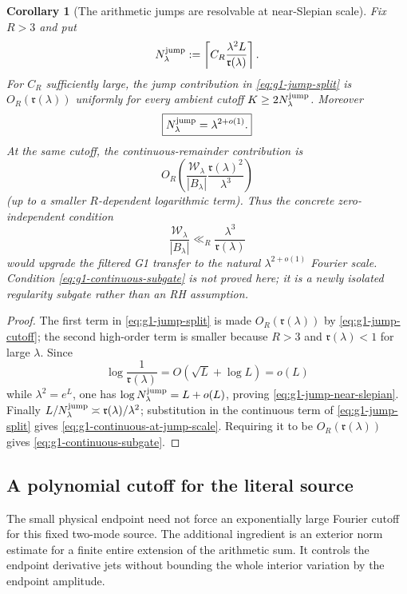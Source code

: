\documentclass[11pt]{article}
\newtheorem{corollary}[theorem]{Corollary}
\theoremstyle{remark}
\begin{document}
\begin{corollary}[The arithmetic jumps are resolvable at near-Slepian scale]\label{cor:g1-jump-natural-scale}
Fix $R>3$ and put
\begin{equation}\label{eq:g1-jump-cutoff}
 N_\lambda^{\rm jump}
 :=\left\lceil
 C_R\frac{\lambda^2L}{\mathfrak r(\lambda)}
 \right\rceil.
\end{equation}
For $C_R$ sufficiently large, the jump contribution in
\eqref{eq:g1-jump-split} is $O_R(\mathfrak r(\lambda))$ uniformly for every
ambient cutoff $K\ge2N_\lambda^{\rm jump}$.  Moreover
\begin{equation}\label{eq:g1-jump-near-slepian}
 \boxed{
 N_\lambda^{\rm jump}=\lambda^{2+o(1)}.}
\end{equation}
At the same cutoff, the continuous-remainder contribution is
\begin{equation}\label{eq:g1-continuous-at-jump-scale}
 O_R\!\left(
 \frac{\mathcal W_\lambda}{|B_\lambda|}
 \frac{\mathfrak r(\lambda)^2}{\lambda^3}
 \right)
\end{equation}
(up to a smaller $R$-dependent logarithmic term).  Thus the concrete
zero-independent condition
\begin{equation}\label{eq:g1-continuous-subgate}
 \boxed{
 \frac{\mathcal W_\lambda}{|B_\lambda|}
 \ll_R\frac{\lambda^3}{\mathfrak r(\lambda)} }
\end{equation}
would upgrade the filtered G1 transfer to the natural
$\lambda^{2+o(1)}$ Fourier scale.  Condition
\eqref{eq:g1-continuous-subgate} is \emph{not} proved here; it is a newly
isolated regularity subgate rather than an RH assumption.
\end{corollary}
\begin{proof}
The first term in \eqref{eq:g1-jump-split} is made
$O_R(\mathfrak r(\lambda))$ by \eqref{eq:g1-jump-cutoff}; the second
high-order term is smaller because $R>3$ and $\mathfrak r(\lambda)<1$ for
large $\lambda$.  Since
\[
 \log\frac1{\mathfrak r(\lambda)}=O(\sqrt L+\log L)=o(L)
\]
while $\lambda^2=e^L$, one has
$\log N_\lambda^{\rm jump}=L+o(L)$, proving
\eqref{eq:g1-jump-near-slepian}.  Finally
$L/N_\lambda^{\rm jump}\asymp
\mathfrak r(\lambda)/\lambda^2$; substitution in the continuous term of
\eqref{eq:g1-jump-split} gives
\eqref{eq:g1-continuous-at-jump-scale}.  Requiring it to be
$O_R(\mathfrak r(\lambda))$ gives
\eqref{eq:g1-continuous-subgate}.
\end{proof}


\subsection*{A polynomial cutoff for the literal source}
The small physical endpoint need not force an exponentially large Fourier
cutoff for this fixed two-mode source.  The additional ingredient is an
exterior norm estimate for a finite entire extension of the arithmetic
sum.  It controls the endpoint derivative jets without bounding the whole
interior variation by the endpoint amplitude.
\end{document}
